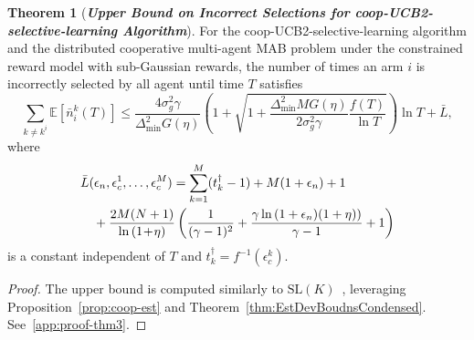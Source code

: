 \documentclass[final,5p,times,twocolumn]{elsarticle}
\theoremstyle{definition}
\newtheorem{theorem}{Theorem}
\newcommand{\lnn}[1]{%
	\ln  \left(#1\right)%
}
\newcommand\bit[1]{\textit{\textbf{#1}}}
\begin{document}
\begin{theorem}[\bit{Upper Bound on Incorrect Selections for coop-UCB2-selective-learning Algorithm}]\label{thm:incorrect-selections}
For the coop-UCB2-selective-learning algorithm and the distributed cooperative multi-agent MAB problem under the constrained reward model with sub-Gaussian rewards, the number of times an arm $i$ is incorrectly selected by all agent until time $T$ satisfies
		\begin{equation*}
	\sum_{k \neq k^i}  \mathbb{E} \left[ \bar  n_i^k(T)  \right] \leq   \frac{4 \sigma_g^2 \gamma  }{\Delta_{\min}^2 G(\eta)}  \left( 1 + \sqrt{1  +  \frac{\Delta_{\min}^2 MG(\eta)}{2 \sigma_g^2 \gamma} \frac{f(T)}{\ln T}} \right)  \ln T + \bar L,
	\end{equation*}
	where
	\begin{align}
	    & \bar L(\epsilon_n, \epsilon_c^1, \ldots, \epsilon_c^M) = \sum_{k=1}^M (t_k^\dag -1)+  M (1+\epsilon_n) + 1
	     \nonumber \\
	    & \quad + \frac{2M(N+1)}{\lnn{1\!+\!\eta}}   \left( \frac{1}{(\gamma - 1)^2} +  {\frac{\gamma \lnn{1 + \epsilon_n)(1 + \eta)}}{\gamma - 1} +1} \right) 
	    \label{eq:Lbar}
	\end{align}
is a constant independent of $T$ and $t^\dagger_k= f^{-1}(\epsilon_c^k)$. 	
% 
% 		
\end{theorem}
\begin{proof}
The upper bound is computed similarly to $\mathrm{SL}(K)$~\cite{gai2014distributed}, leveraging Proposition~\ref{prop:coop-est} and Theorem~\ref{thm:EstDevBoudnsCondensed}.  See~\ref{app:proof-thm3}.  
\end{proof}
\end{document}
